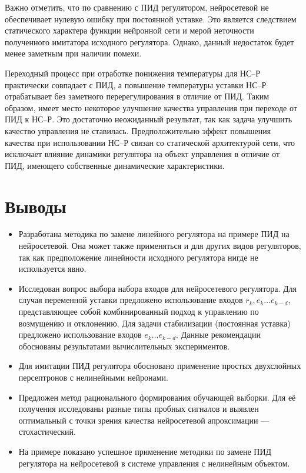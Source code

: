 Важно отметить, что по сравнению с ПИД регулятором, нейросетевой не
обеспечивает нулевую ошибку при постоянной уставке.  Это является
следствием статического характера функции нейронной сети и мерой
неточности полученного имитатора исходного регулятора.  Однако, данный
недостаток будет менее заметным при наличии помехи.

Переходный процесс при отработке понижения температуры для НС--Р
практически совпадает с ПИД, а повышение температуры уставки НС--Р
отрабатывает без заметного перерегулирования в отличие от ПИД.  Таким
образом, имеет место некоторое улучшение качества управления при
переходе от ПИД к НС--Р.  Это достаточно неожиданный результат, так
как задача улучшить качество управления не ставилась.
Предположительно эффект повышения качества при использовании НС--Р
связан со статической архитектурой сети, что исключает влияние
динамики регулятора на объект управления в отличие от ПИД, имеющего
собственные динамические характеристики.


\section{Выводы}

\begin{itemize}

\item Разработана методика по замене линейного регулятора на примере
  ПИД на нейросетевой.  Она может также применяться и для других видов
  регуляторов, так как предположение линейности исходного регулятора
  нигде не используется явно.

\item Исследован вопрос выбора набора входов для нейросетевого
  регулятора.  Для случая переменной уставки предложено использование
  входов $r_k,e_k\ldots e_{k-d}$, представляющее собой комбинированный
  подход к управлению по возмущению и отклонению.  Для задачи
  стабилизации (постоянная уставка) предложено использование входов
  $e_k\ldots e_{k-d}$.  Данные рекомендации обоснованы результатами
  вычислительных экспериментов.

\item Для имитации ПИД регулятора обосновано применение простых
  двухслойных персептронов с нелинейными нейронами.

\item Предложен метод рационального формирования обучающей выборки.
  Для её получения исследованы разные типы пробных сигналов и выявлен
  оптимальный с точки зрения качества нейросетевой апроксимации ---
  стохастический.

\item На примере показано успешное применение методики по замене ПИД
  регулятора на нейросетевой в системе управления с нелинейным
  объектом.



\end{itemize}
